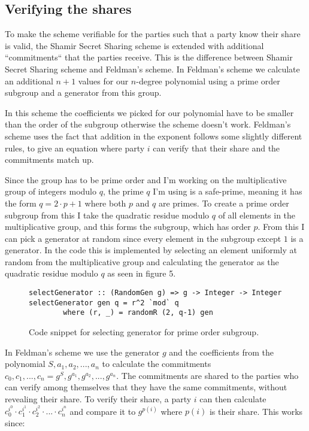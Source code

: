 \documentclass[a4paper,oneside,12pt,final]{article}
\begin{document}
\subsection{Verifying the shares}

To make the scheme verifiable for the parties such that a party know their share
is valid, the Shamir Secret Sharing scheme is extended with additional
``commitments`` that the parties receive. This is the difference between Shamir
Secret Sharing scheme and Feldman's scheme. In Feldman's scheme we calculate an
additional $n+1$ values for our $n$-degree polynomial using a prime order
subgroup and a generator from this group. 

In this scheme the coefficients we picked for our polynomial have to be smaller
than the order of the subgroup otherwise the scheme doesn't work. Feldman's
scheme uses the fact that addition in the exponent follows some slightly
different rules, to give an equation where party $i$ can verify that their share
and the commitments match up. 

Since the group has to be prime order and I'm working on the multiplicative
group of integers modulo $q$, the prime $q$ I'm using is a safe-prime, meaning
it has the form $q = 2 \cdot p + 1$ where both $p$ and $q$ are primes. To create
a prime order subgroup from this I take the quadratic residue modulo $q$ of all
elements in the multiplicative group, and this forms the subgroup, which has
order $p$. From this I can pick a generator at random since every element in the
subgroup except $1$ is a generator. In the code this is implemented by selecting
an element uniformly at random from the multiplicative group and calculating the
generator as the quadratic residue modulo $q$ as seen in
figure 5.

\begin{figure}[h]
\label{fig:select-generator}
\begin{verbatim}
selectGenerator :: (RandomGen g) => g -> Integer -> Integer
selectGenerator gen q = r^2 `mod` q
        where (r, _) = randomR (2, q-1) gen
\end{verbatim}
\caption{Code snippet for selecting generator for prime order subgroup.}
\end{figure}

In Feldman's scheme we use the generator $g$ and the coefficients from the
polynomial $S, a_1, a_2, ..., a_n$ to calculate the commitments $c_0, c_1, ...,
c_n = g^S, g^{a_1}, g^{a_2}, ..., g^{a_n}$. The commitments are shared to the
parties who can verify among themselves that they have the same commitments,
without revealing their share. To verify their share, a party $i$ can then
calculate $c_0^{i^0}\cdot c_1^{i^1} \cdot c_2^{i^2} \cdot ... \cdot c_n^{i^n}$
and compare it to $g^{p(i)}$ where $p(i)$ is their share. This works since:
\end{document}
